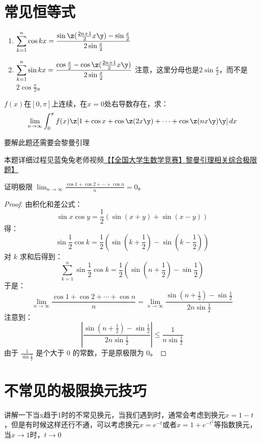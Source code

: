 \section{常见恒等式}
\begin{lemma}
\begin{enumerate}
\item $ \displaystyle \sum\limits_{k=1}^{n} \cos kx = 
        \frac{\sin\z(\frac{2n+1}{2} x\y)-\sin \frac{x}{2}}{2\sin \frac{x}{2}}$
\item $ \displaystyle \sum\limits_{k=1}^{n} \sin kx = 
        \frac{\cos \frac{x}{2}-\cos\z(\frac{2n+1}{2} x\y)}{2\sin \frac{x}{2}}$
        注意，这里分母也是$2\sin \frac{x}{2}$，而不是$2\cos \frac{x}{2}$。
\end{enumerate}
\end{lemma}

\begin{example}
$f(x)$在$[0,\pi]$上连续，在$x=0 $处右导数存在，求：
\[ \lim_{n\to \infty} \int_{0}^{\pi}f(x)\z[1+\cos x+ \cos\z(2x\y)+\cdots+ \cos \z(n x\y)  \y]  \,dx  \]
\end{example}
\begin{remark}
要解此题还需要会黎曼引理

本题详细过程见蓝兔兔老师视频\href{ https://www.bilibili.com/video/BV17x4y1b7e2/?share_source=copy_web&vd_source=270527b9d8a800872b201575fba2747c}{【【全国大学生数学竞赛】黎曼引理相关综合极限题】}
\end{remark}

\begin{example}
证明极限 \(\displaystyle \lim_{n \to \infty} \frac{\cos 1 + \cos 2 + \cdots + \cos n}{n} = 0\)。
\end{example}
\begin{proof}
由积化和差公式：
\[\sin x \cos y = \frac{1}{2} (\sin(x + y) + \sin(x - y))\]
得：
\[\sin \frac{1}{2} \cos k = \frac{1}{2} (\sin(k + \frac{1}{2}) - \sin(k - \frac{1}{2}))\]
对 \(k\) 求和后得到：
\[\sum_{k=1}^n \sin \frac{1}{2} \cos k = \frac{1}{2} (\sin(n + \frac{1}{2}) - \sin \frac{1}{2})\]
于是：
\[\lim_{n \to \infty} \frac{\cos 1 + \cos 2 + \cdots + \cos n}{n} = \lim_{n \to \infty} \frac{\sin(n + \frac{1}{2}) - \sin \frac{1}{2}}{2n \sin \frac{1}{2}}\]
注意到：
\[\left| \frac{\sin(n + \frac{1}{2}) - \sin \frac{1}{2}}{2n \sin \frac{1}{2}} \right| \leq \frac{1}{n \sin \frac{1}{2}}\]
由于 \(\frac{1}{\sin \frac{1}{2}}\) 是个大于 0 的常数，于是原极限为 0。
\end{proof}


\section{不常见的极限换元技巧}
讲解一下当x趋于1时的不常见换元，当我们遇到时，通常会考虑到换元\(x=1-t\)，但是有时候这样还行不通，可以考虑换元\(x=e^{-t}\)或者\(x=1+e^{-t^2}\)等指数换元，当\(x\to 1\)时，\(t\to 0\)

